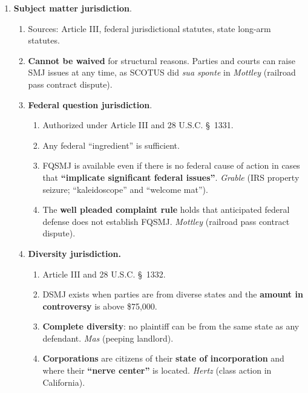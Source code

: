 \begin{enumerate}
\begin{enumerate}
        \item \textbf{Subject matter jurisdiction}.
        \begin{enumerate}
            \item Sources: Article III, federal jurisdictional statutes, 
            state long-arm statutes.
            \item \textbf{Cannot be waived} for structural reasons. Parties 
            and courts can raise SMJ issues at any time, as SCOTUS did 
            \emph{sua sponte} in \emph{Mottley} (railroad pass contract 
            dispute).
            \item \textbf{Federal question jurisdiction}.
            \begin{enumerate}
                \item Authorized under Article III and 28 U.S.C. \S\ 1331.
                \item Any federal ``ingredient'' is sufficient.
                \item FQSMJ is available even if there is no federal cause of 
                action in cases that \textbf{``implicate significant federal 
                issues''}. \emph{Grable} (IRS property seizure; 
                ``kaleidoscope'' and ``welcome mat'').
                \item The \textbf{well pleaded complaint rule} holds that 
                anticipated federal defense does not establish FQSMJ. 
                \emph{Mottley} (railroad pass contract dispute).
            \end{enumerate}
            \item \textbf{Diversity jurisdiction.}
            \begin{enumerate}
                \item Article III and 28 U.S.C. \S\ 1332.
                \item DSMJ exists when parties are from diverse states and the 
                \textbf{amount in controversy} is above \$75,000.
                \item \textbf{Complete diversity}: no plaintiff can be from 
                the same state as any defendant. \emph{Mas} (peeping landlord).
                \item \textbf{Corporations} are citizens of their 
                \textbf{state of incorporation} and where their 
                \textbf{``nerve center''} is located. \emph{Hertz} (class 
                action in California).
            \end{enumerate}

\end{enumerate}
\end{enumerate}
\end{enumerate}
